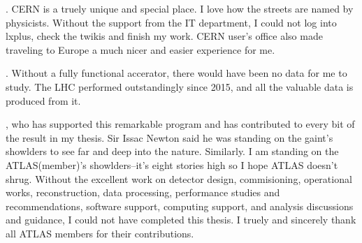

. CERN is a truely unique and special place. I love how the streets are named by physicists. Without the support from the IT department, I could not log into lxplus, check the twikis and finish my work. CERN user's office also made traveling to Europe a much nicer and easier experience for me. 

. Without a fully functional accerator, there would have been no data for me to study. The LHC performed outstandingly since 2015, and all the valuable data is produced from it. 

, who has supported this remarkable program and has contributed to every bit of the result in my thesis. Sir Issac Newton said he was standing on the gaint's showlders to see far and deep into the nature. Similarly. I am standing on the ATLAS(member)'s showlders--it's eight stories high so I hope ATLAS doesn't shrug. Without the excellent work on detector design, commisioning, operational works, reconstruction, data processing, performance studies and recommendations, software support, computing support, and analysis discussions and guidance, I could not have completed this thesis. I truely and sincerely thank all ATLAS members for their contributions.


